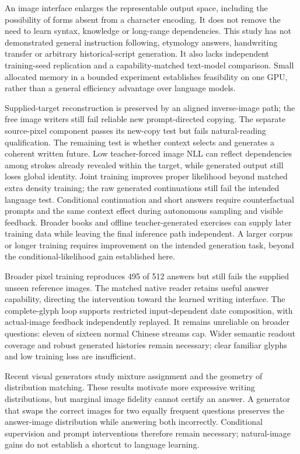 \documentclass[12pt,a4paper]{article}
\begin{document}
An image interface enlarges the representable output space, including the
possibility of forms absent from a character encoding. It does not remove the
need to learn syntax, knowledge or long-range dependencies. This study has not
demonstrated general instruction following, etymology answers, handwriting
transfer or arbitrary historical-script generation. It also lacks independent
training-seed replication and a capability-matched text-model comparison.
Small allocated memory in a bounded experiment establishes feasibility on one
GPU, rather than a general efficiency advantage over language models.

Supplied-target reconstruction is preserved by an aligned inverse-image path;
the free image writers still fail reliable new prompt-directed copying. The separate
source-pixel component passes its new-copy test but fails natural-reading
qualification. The remaining test is whether context selects and generates a
coherent written future. Low teacher-forced
image NLL can reflect dependencies among strokes already revealed within the
target, while generated output still loses global identity. Joint training
improves proper likelihood beyond matched extra density training; the raw
generated continuations still fail the intended language test. Conditional
continuation and short answers require counterfactual prompts and the same
context effect during autonomous sampling and visible feedback.
Broader books and offline teacher-generated exercises can supply later
training data while leaving the final inference path independent. A larger
corpus or longer training requires improvement on the intended generation
task, beyond the conditional-likelihood gain established here.

Broader pixel training reproduces 495 of 512 answers but still fails the
supplied unseen reference images. The matched native reader retains useful
answer capability, directing the intervention toward the learned writing
interface. The complete-glyph loop supports restricted input-dependent date
composition, with actual-image feedback independently replayed. It remains
unreliable on broader questions: eleven of sixteen normal Chinese streams cap.
Wider semantic readout coverage and robust generated histories remain
necessary; clear familiar glyphs and low training loss are insufficient.


Recent visual generators study mixture assignment and the geometry of
distribution matching\cite{mgflow,semot}. These results motivate more expressive
writing distributions, but marginal image fidelity cannot certify an answer.
A generator that swaps the correct images for two equally frequent questions
preserves the answer-image distribution while answering both incorrectly.
Conditional supervision and prompt interventions therefore remain necessary;
natural-image gains do not establish a shortcut to language learning.
\end{document}
